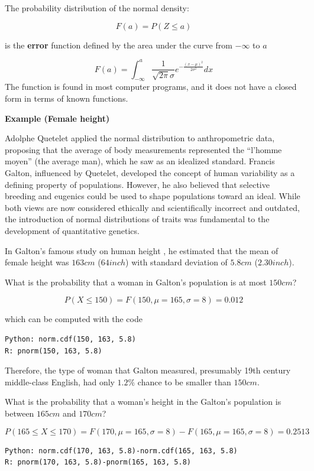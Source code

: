 \documentclass[
]{book}
\begin{document}
The probability distribution of the normal density:

\[F(a)=P(Z \leq a)\]

is the \textbf{error} function defined by the area under the curve from \(-\infty\) to \(a\)

\[F(a)=\int_{-\infty}^{a}\frac{1}{\sqrt{2\pi}\sigma}e^{-\frac{(x-\mu)^2}{2\sigma^2}} dx\]
The function is found in most computer programs, and it does not have a closed form in terms of known functions.

\textbf{Example (Female height)}

Adolphe Quetelet applied the normal distribution to anthropometric data, proposing that the average of body measurements represented the ``l'homme moyen'' (the average man), which he saw as an idealized standard. Francis Galton, influenced by Quetelet, developed the concept of human variability as a defining property of populations. However, he also believed that selective breeding and eugenics could be used to shape populations toward an ideal. While both views are now considered ethically and scientifically incorrect and outdated, the introduction of normal distributions of traits was fundamental to the development of quantitative genetics.

In Galton's famous study on human height \citep{Galton1886}, he estimated that the mean of female height was \(163cm\) (\(64inch\)) with standard deviation of \(5.8cm\) (\(2.30inch\)).

What is the probability that a woman in Galton's population is at most \(150cm\)?

\[P(X\le 150)=F(150, \mu=165, \sigma=8)=0.012\]

which can be computed with the code

\begin{verbatim}
Python: norm.cdf(150, 163, 5.8)
R: pnorm(150, 163, 5.8)
\end{verbatim}

Therefore, the type of woman that Galton measured, presumably 19th century middle-class English, had only \(1.2\%\) chance to be smaller than \(150cm\).

What is the probability that a woman's height in the Galton's population is between \(165cm\) and \(170cm\)?

\[P(165 \le X \le 170)=F(170, \mu=165, \sigma=8)-F(165, \mu=165, \sigma=8)=0.2513\]

\begin{verbatim}
Python: norm.cdf(170, 163, 5.8)-norm.cdf(165, 163, 5.8)
R: pnorm(170, 163, 5.8)-pnorm(165, 163, 5.8)
\end{verbatim}
\end{document}
